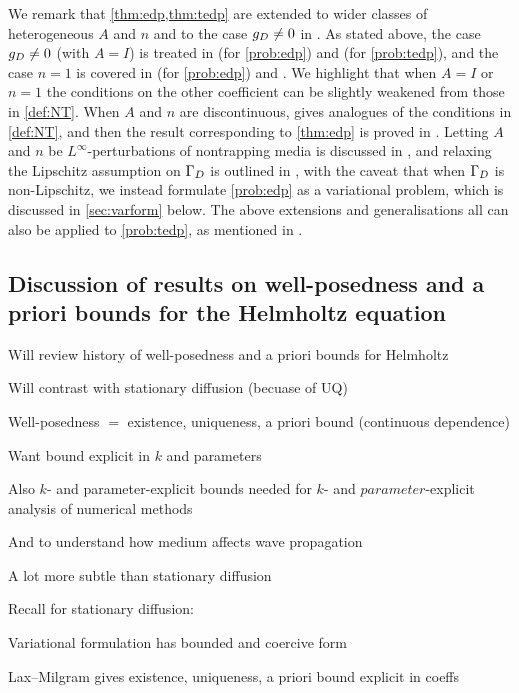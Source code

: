 We remark that \cref{thm:edp,thm:tedp} are extended to wider classes of heterogeneous $A$ and $n$ and to the case $g_{D} \neq 0$ in \cite{GrPeSp:19}. As stated above, the case $g_{D} \neq 0$ (with $A=I$) is treated in \cite[Theorem 2.19(ii)]{GrPeSp:19} (for \cref{prob:edp}) and \cite[Theorem A.6(iv)]{GrPeSp:19} (for \cref{prob:tedp}), and the case $n=1$ is covered in \cite[Theorem 2.19(i)]{GrPeSp:19} (for \cref{prob:edp}) and \cite[Theorem A.6(ii)]{GrPeSp:19}. We highlight that when $A=I$ or $n=1$ the conditions on the other coefficient can be slightly weakened from those in \cref{def:NT}. When $A$ and $n$ are discontinuous, \cite[Condition 2.6]{GrPeSp:19} gives analogues of the conditions in \cref{def:NT}, and then the result corresponding to \cref{thm:edp} is proved in \cite[Theorem 2.7]{GrPeSp:19}. Letting $A$ and $n$ be $L^\infty$-perturbations of nontrapping media is discussed in \cite[Remark 2.15]{GrPeSp:19}, and relaxing the Lipschitz assumption on $\Gamma_{D}$ is outlined in \cite[Remark 2.13]{GrPeSp:19}, with the caveat that when $\Gamma_{D}$ is non-Lipschitz, we instead formulate \cref{prob:edp} as a variational problem, which is discussed in \cref{sec:varform} below. The above extensions and generalisations all can also be applied to \cref{prob:tedp}, as mentioned in \cite[p. 2916]{GrPeSp:19}.

\subsection{Discussion of results on well-posedness and a priori bounds for the Helmholtz equation}\label{sec:wpdisc}
\bit
\item Will review history of well-posedness and a priori bounds for Helmholtz
\item Will contrast with stationary diffusion (becuase of UQ)
  \eit

  \bit
\item Well-posedness $=$ existence, uniqueness, a priori bound (continuous dependence)
\item Want bound explicit in $k$ and parameters
  \item Also $k$- and parameter-explicit bounds needed for $k$- and $parameter$-explicit analysis of numerical methods
  \item And to understand how medium affects wave propagation
    \item A lot more subtle than stationary diffusion
  \eit

Recall for stationary diffusion:
\bit
\item Variational formulation has bounded and coercive form
\item Lax--Milgram gives existence, uniqueness, a priori bound explicit in coeffs
\eit
  
